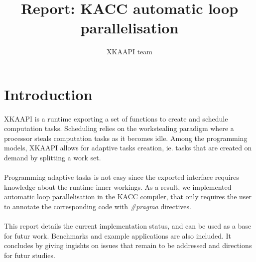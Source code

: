 \documentclass[a4paper, 11pt]{article}
\begin{document}
\title{Report: KACC automatic loop parallelisation}
\author{XKAAPI team}
\date{}

\maketitle

\newpage
\tableofcontents
{}



%
\newpage
\section{Introduction}
\paragraph{}
XKAAPI is a runtime exporting a set of functions to create and schedule computation tasks.
Scheduling relies on the workstealing paradigm where a processor steals computation tasks
as it becomes idle. Among the programming models, XKAAPI allows for adaptive tasks creation,
ie. tasks that are created on demand by splitting a work set.
\paragraph{}
Programming adaptive tasks is not easy since the exported interface requires knowledge
about the runtime inner workings. As a result, we implemented automatic loop parallelisation
in the KACC compiler, that only requires the user to annotate the corresponding code with
\textit{\#pragma} directives.
\paragraph{}
This report details the current implementation status, and can be used as a base for futur
work. Benchmarks and example applications are also included. It concludes by giving ingishts
on issues that remain to be addressed and directions for futur studies.
\end{document}
